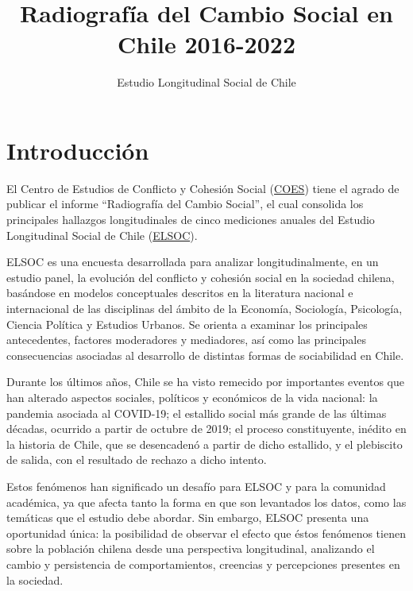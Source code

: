 \documentclass[
  12pt,
]{book}
\title{Radiografía del Cambio Social en Chile 2016-2022}
\subtitle{Estudio Longitudinal Social de Chile}
\author{}
\date{\vspace{-2.5em}}
\begin{document}
\maketitle

{
\hypersetup{linkcolor=}
\setcounter{tocdepth}{1}
\tableofcontents
}
\listoffigures
\listoftables
{}
\hypertarget{introducciuxf3n}{%
\chapter*{Introducción}\label{introducciuxf3n}}

El Centro de Estudios de Conflicto y Cohesión Social (\href{https://coes.cl/}{COES}) tiene el agrado de publicar el informe ``Radiografía del Cambio Social'', el cual consolida los principales hallazgos longitudinales de cinco mediciones anuales del Estudio Longitudinal Social de Chile (\href{https://coes.cl/encuesta-panel/}{ELSOC}).

ELSOC es una encuesta desarrollada para analizar longitudinalmente, en un estudio panel, la evolución del conflicto y cohesión social en la sociedad chilena, basándose en modelos conceptuales descritos en la literatura nacional e internacional de las disciplinas del ámbito de la Economía, Sociología, Psicología, Ciencia Política y Estudios Urbanos. Se orienta a examinar los principales antecedentes, factores moderadores y mediadores, así como las principales consecuencias asociadas al desarrollo de distintas formas de sociabilidad en Chile.

Durante los últimos años, Chile se ha visto remecido por importantes eventos que han alterado aspectos sociales, políticos y económicos de la vida nacional: la pandemia asociada al COVID-19; el estallido social más grande de las últimas décadas, ocurrido a partir de octubre de 2019; el proceso constituyente, inédito en la historia de Chile, que se desencadenó a partir de dicho estallido, y el plebiscito de salida, con el resultado de rechazo a dicho intento.

Estos fenómenos han significado un desafío para ELSOC y para la comunidad académica, ya que afecta tanto la forma en que son levantados los datos, como las temáticas que el estudio debe abordar. Sin embargo, ELSOC presenta una oportunidad única: la posibilidad de observar el efecto que éstos fenómenos tienen sobre la población chilena desde una perspectiva longitudinal, analizando el cambio y persistencia de comportamientos, creencias y percepciones presentes en la sociedad.
\end{document}

